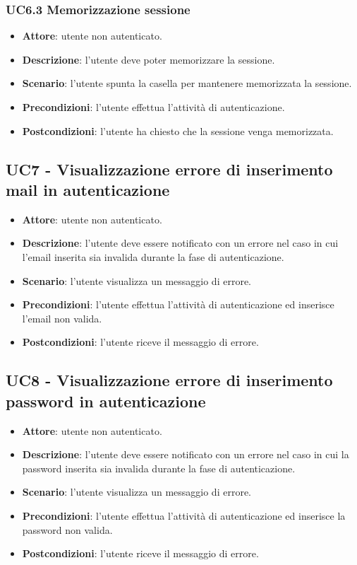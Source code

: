\subsubsection{UC6.3 Memorizzazione sessione}
\begin{itemize}
    \item \textbf{Attore}: utente non autenticato.
    \item \textbf{Descrizione}: l'utente deve poter memorizzare la sessione.
    \item \textbf{Scenario}: l'utente spunta la casella per mantenere memorizzata la sessione.
    \item \textbf{Precondizioni}: l'utente effettua l'attività di autenticazione.
    \item \textbf{Postcondizioni}: l'utente ha chiesto che la sessione venga memorizzata.
\end{itemize}

\subsection{UC7 - Visualizzazione errore di inserimento mail in autenticazione}
\begin{itemize}
    \item \textbf{Attore}: utente non autenticato.
    \item \textbf{Descrizione}: l'utente deve essere notificato con un errore nel caso in cui l'email inserita sia invalida durante la fase di autenticazione.
    \item \textbf{Scenario}: l'utente visualizza un messaggio di errore. 
    \item \textbf{Precondizioni}: l'utente effettua l'attività di autenticazione ed inserisce l'email non valida.
    \item \textbf{Postcondizioni}: l'utente riceve il messaggio di errore.
\end{itemize}

\subsection{UC8 - Visualizzazione errore di inserimento password in autenticazione} 
\begin{itemize}
    \item \textbf{Attore}: utente non autenticato.
    \item \textbf{Descrizione}: l'utente deve essere notificato con un errore nel caso in cui la password inserita sia invalida durante la fase di autenticazione.
    \item \textbf{Scenario}: l'utente visualizza un messaggio di errore. 
    \item \textbf{Precondizioni}: l'utente effettua l'attività di autenticazione ed inserisce la password non valida.
    \item \textbf{Postcondizioni}: l'utente riceve il messaggio di errore.
\end{itemize}

